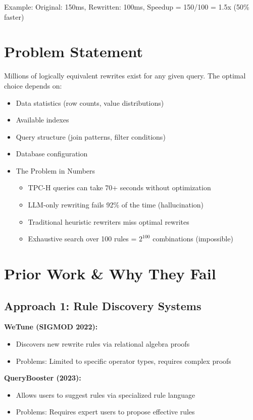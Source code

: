 \documentclass[12pt,a4paper]{article}
\begin{document}
Example: Original: 150ms, Rewritten: 100ms, Speedup = 150/100 = 1.5x (50\% faster)

\section{Problem Statement}


Millions of logically equivalent rewrites exist for any given query. The optimal choice depends on:
\begin{itemize}
    \item Data statistics (row counts, value distributions)
    \item Available indexes
    \item Query structure (join patterns, filter conditions)
    \item Database configuration
    \item The Problem in Numbers
    \begin{itemize}
        \item TPC-H queries can take 70+ seconds without optimization
    \item LLM-only rewriting fails 92\% of the time (hallucination)
    \item Traditional heuristic rewriters miss optimal rewrites
    \item Exhaustive search over 100 rules = $2^{100}$ combinations (impossible)
    \end{itemize}  
\end{itemize}

\section{Prior Work \& Why They Fail}

\subsection{Approach 1: Rule Discovery Systems}
\hspace{.4cm}\textbf{WeTune (SIGMOD 2022):}
\begin{itemize}
    \item Discovers new rewrite rules via relational algebra proofs
    \item Problems: Limited to specific operator types, requires complex proofs
\end{itemize}

\textbf{QueryBooster (2023):}
\begin{itemize}
    \item Allows users to suggest rules via specialized rule language
    \item Problems: Requires expert users to propose effective rules
\end{itemize}
\end{document}
